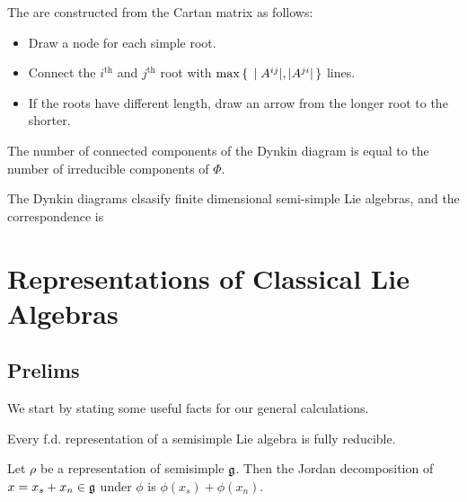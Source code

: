 \documentclass{article}
\begin{document}
\begin{definition}
	The  are constructed from the Cartan matrix as follows:
	\begin{itemize}
		\item Draw a node for each simple root.
		\item Connect the $i^{\text{th}}$ and $j^\text{th}$ root with $\max\set{  |A^{ij}|, |A^{ji}|  }$ lines. 
		\item If the roots have different length, draw an arrow from the longer root to the shorter. 
	\end{itemize}
\end{definition}

\begin{prop}
	The number of connected components of the Dynkin diagram is equal to the number of irreducible components of $\Phi$. 
\end{prop}

\begin{theorem}
	The Dynkin diagrams clsasify finite dimensional semi-simple Lie algebras, and the correspondence is 
\end{theorem}

\section{Representations of Classical Lie Algebras}
\subsection{Prelims}
We start by stating some useful facts for our general calculations. 

\begin{theorem}[Weyl]
	Every f.d. representation of a semisimple Lie algebra is fully reducible. 
\end{theorem}

\begin{prop}
	Let $\rho$ be a representation of semisimple $\mathfrak{g}$. Then the Jordan decomposition of $x = x_s + x_n \in \mathfrak{g}$ under $\phi$ is $\phi(x_s)+\phi(x_n)$. 
\end{prop}
\end{document}
